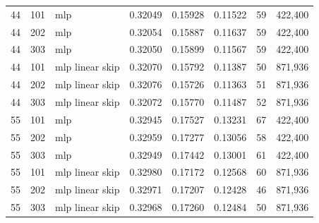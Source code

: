 \begin{table}[ht]
\begin{tabular}{rrlrrrrr}
44 & 101 & mlp & 0.32049 & 0.15928 & 0.11522 & 59 & 422,400 \\
44 & 202 & mlp & 0.32054 & 0.15887 & 0.11637 & 59 & 422,400 \\
44 & 303 & mlp & 0.32050 & 0.15899 & 0.11567 & 59 & 422,400 \\
44 & 101 & mlp linear skip & 0.32070 & 0.15792 & 0.11387 & 50 & 871,936 \\
44 & 202 & mlp linear skip & 0.32076 & 0.15726 & 0.11363 & 51 & 871,936 \\
44 & 303 & mlp linear skip & 0.32072 & 0.15770 & 0.11487 & 52 & 871,936 \\
55 & 101 & mlp & 0.32945 & 0.17527 & 0.13231 & 67 & 422,400 \\
55 & 202 & mlp & 0.32959 & 0.17277 & 0.13056 & 58 & 422,400 \\
55 & 303 & mlp & 0.32949 & 0.17442 & 0.13001 & 61 & 422,400 \\
55 & 101 & mlp linear skip & 0.32980 & 0.17172 & 0.12568 & 60 & 871,936 \\
55 & 202 & mlp linear skip & 0.32971 & 0.17207 & 0.12428 & 46 & 871,936 \\
55 & 303 & mlp linear skip & 0.32968 & 0.17260 & 0.12484 & 50 & 871,936 \\
\bottomrule\end{tabular}\end{table}

